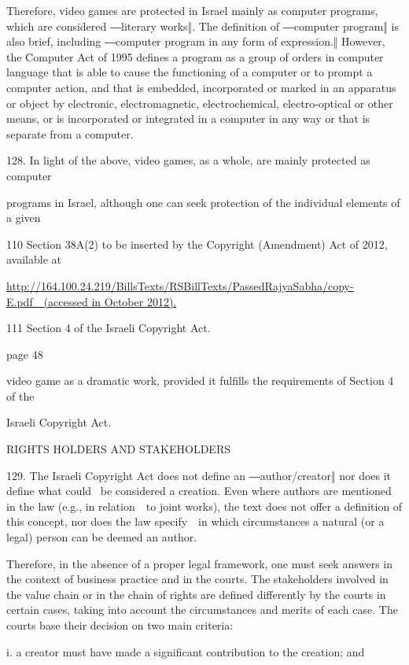 \documentclass[
]{article}
\begin{document}
{Therefore, video games are protected in Israel mainly as computer
programs, which are }{considered ―}{literary works‖}{. }{The definition
of ―computer program‖ is also brief, including ―}{computer program in
any form of expression.‖ }{However, the }{Computer Act of 1995 }{defines
a program as a group of orders in computer language that is able to
cause the functioning of a computer or to prompt a computer action, and
that is embedded, incorporated or marked in an apparatus or object by
electronic, electromagnetic, electrochemical, electro-optical or other
means, or is incorporated or integrated in a computer in any way or that
is separate from a computer.}

{128. }{In light of the above, video games, as a whole, are mainly
protected as computer}

{programs in Israel, although one can seek protection of the individual
elements of a given}

{110 }{Section 38A(2) to be inserted by the }{Copyright (Amendment) Act
of 2012}{, available at}

\href{http://164.100.24.219/BillsTexts/RSBillTexts/PassedRajyaSabha/copy-E.pdf}{{http://164.100.24.219/BillsTexts/RSBillTexts/PassedRajyaSabha/copy-E.pdf~~(accessed
in October 2012).}}

{111 }{Section 4 of the Israeli }{Copyright Act}{.}

{page 48}

{video game as a dramatic work, provided it fulfills the requirements of
Section 4 of the}

{Israeli }{Copyright Act}{.}

{RIGHTS HOLDERS AND STAKEHOLDERS}

{129. }{The Israeli }{Copyright Act }{does not define an
―author/creator‖ nor does it define what could }{~be considered a
creation. Even where }{authors }{are mentioned in the law (e.g., in
relation~~to joint works), the text does not offer a definition of this
concept, nor does the law specify~~in which circumstances a natural (or
a legal) person can be deemed an }{author.}

{Therefore, in the absence of a proper legal framework, one must seek
answers in the context of business practice and in the courts. The
stakeholders involved in the value chain or in the chain of rights are
defined differently by the courts in certain cases, taking into account
the circumstances and merits of each case. The courts base their
decision on two main criteria:}

{i. }{a creator must have made a significant contribution to the
creation; and}
\end{document}
